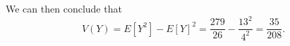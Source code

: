 \documentclass[9pt]{article}
\begin{document}
\begin{enumerate}
\begin{enumerate}
               We can then conclude that
               $$V(Y) = E[Y^2] - E[Y]^2 = \frac{279}{26} - \frac{13^2}{4^2}
                 = \frac{35}{208}.$$
      \end{enumerate}
\end{enumerate}
\end{document}
